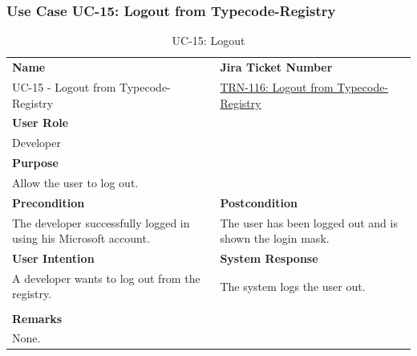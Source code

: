 \subsubsection{Use Case UC-15: Logout from Typecode-Registry}\label{subsubsec:use-case-uc-15:-logout}

\begin{table}[H]
    \centering
    \begin{tabular}{|p{}|p{}|}

        \hline
        \rowcolor{gray!50}\textbf{Name} & \rowcolor{gray!50}\textbf{Jira Ticket Number} \\
        UC-15 - Logout from Typecode-Registry
        &
        \href{https://fh-burgenland.atlassian.net/browse/TRN-116}{TRN-116: Logout from Typecode-Registry} \\ \hline

        \multicolumn{2}{|l|}{\rowcolor{gray!50}\textbf{User Role}} \\
        \multicolumn{2}{|l|}{Developer} \\ \hline

        \multicolumn{2}{|l|}{\rowcolor{gray!50}\textbf{Purpose}} \\
        \multicolumn{2}{|l|}{Allow the user to log out.} \\ \hline

        \rowcolor{gray!50}\textbf{Precondition} & \rowcolor{gray!50}\textbf{Postcondition} \\
        The developer successfully logged in using his Microsoft account.
        &
        The user has been logged out and is shown the login mask.  \\ \hline

        \rowcolor{gray!50}\textbf{User Intention} & \rowcolor{gray!50}\textbf{System Response} \\
        A developer wants to log out from the registry.
        &
        The system logs the user out. \\ \hline

        & \\ \hline

        \multicolumn{2}{|l|}{\rowcolor{gray!50}\textbf{Remarks}} \\
        \multicolumn{2}{|p{1\textwidth}|}{None.} \\ \hline
    \end{tabular}
    \caption{UC-15: Logout}
    \label{tab:uc-logout}
\end{table}

